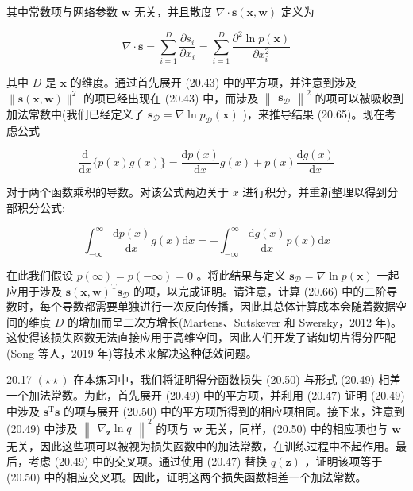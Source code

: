 \documentclass[10pt]{article}
\begin{document}
其中常数项与网络参数 \(\mathbf{w}\) 无关，并且散度 \(\nabla  \cdot  \mathbf{s}\left( {\mathbf{x},\mathbf{w}}\right)\) 定义为

\[
\nabla  \cdot  \mathbf{s} = \mathop{\sum }\limits_{{i = 1}}^{D}\frac{\partial {s}_{i}}{\partial {x}_{i}} = \mathop{\sum }\limits_{{i = 1}}^{D}\frac{{\partial }^{2}\ln p\left( \mathbf{x}\right) }{\partial {x}_{i}^{2}} \tag{20.66}
\]

其中 \(D\) 是 \(\mathbf{x}\) 的维度。通过首先展开 (20.43) 中的平方项，并注意到涉及 \(\parallel \mathbf{s}\left( {\mathbf{x},\mathbf{w}}\right) {\parallel }^{2}\) 的项已经出现在 (20.43) 中，而涉及 \({\begin{Vmatrix}{\mathbf{s}}_{\mathcal{D}}\end{Vmatrix}}^{2}\) 的项可以被吸收到加法常数中(我们已经定义了 \({\mathbf{s}}_{\mathcal{D}} = \nabla \ln {p}_{\mathcal{D}}\left( \mathbf{x}\right)\) )，来推导结果 (20.65)。现在考虑公式

\[
\frac{\mathrm{d}}{\mathrm{d}x}\{ p\left( x\right) g\left( x\right) \}  = \frac{\mathrm{d}p\left( x\right) }{\mathrm{d}x}g\left( x\right)  + p\left( x\right) \frac{\mathrm{d}g\left( x\right) }{\mathrm{d}x} \tag{20.67}
\]

对于两个函数乘积的导数。对该公式两边关于 \(x\) 进行积分，并重新整理以得到分部积分公式:

\[
{\int }_{-\infty }^{\infty }\frac{\mathrm{d}p\left( x\right) }{\mathrm{d}x}g\left( x\right) \mathrm{d}x =  - {\int }_{-\infty }^{\infty }\frac{\mathrm{d}g\left( x\right) }{\mathrm{d}x}p\left( x\right) \mathrm{d}x \tag{20.68}
\]

在此我们假设 \(p\left( \infty \right)  = p\left( {-\infty }\right)  = 0\) 。将此结果与定义 \({\mathbf{s}}_{\mathcal{D}} = \nabla \ln p\left( \mathbf{x}\right)\) 一起应用于涉及 \(\mathbf{s}{\left( \mathbf{x},\mathbf{w}\right) }^{\mathrm{T}}{\mathbf{s}}_{\mathcal{D}}\) 的项，以完成证明。请注意，计算 (20.66) 中的二阶导数时，每个导数都需要单独进行一次反向传播，因此其总体计算成本会随着数据空间的维度 \(D\) 的增加而呈二次方增长(Martens、Sutskever 和 Swersky，2012 年)。这使得该损失函数无法直接应用于高维空间，因此人们开发了诸如切片得分匹配(Song 等人，2019 年)等技术来解决这种低效问题。

20.17 \(\left( {\star  \star  }\right)\) 在本练习中，我们将证明得分函数损失 (20.50) 与形式 (20.49) 相差一个加法常数。为此，首先展开 (20.49) 中的平方项，并利用 (20.47) 证明 (20.49) 中涉及 \({\mathbf{s}}^{\mathrm{T}}\mathbf{s}\) 的项与展开 (20.50) 中的平方项所得到的相应项相同。接下来，注意到 (20.49) 中涉及 \({\begin{Vmatrix}{\nabla }_{\mathbf{z}}\ln q\end{Vmatrix}}^{2}\) 的项与 \(\mathbf{w}\) 无关，同样，(20.50) 中的相应项也与 \(\mathbf{w}\) 无关，因此这些项可以被视为损失函数中的加法常数，在训练过程中不起作用。最后，考虑 (20.49) 中的交叉项。通过使用 (20.47) 替换 \(q\left( \mathbf{z}\right)\) ，证明该项等于 (20.50) 中的相应交叉项。因此，证明这两个损失函数相差一个加法常数。
\end{document}
